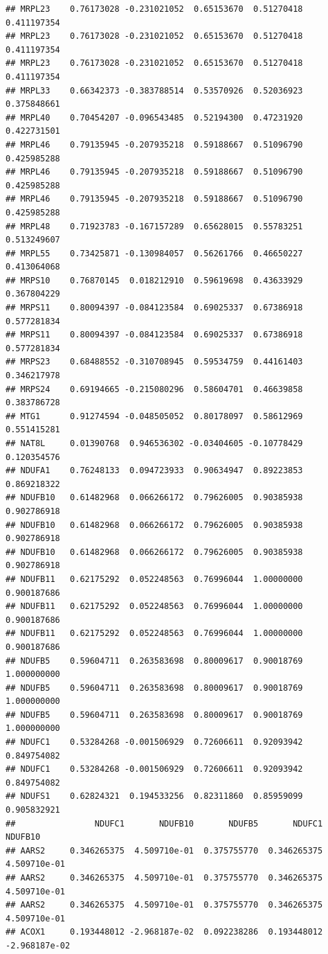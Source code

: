 \documentclass[
]{article}
\begin{document}
\begin{verbatim}
## MRPL23    0.76173028 -0.231021052  0.65153670  0.51270418  0.411197354
## MRPL23    0.76173028 -0.231021052  0.65153670  0.51270418  0.411197354
## MRPL23    0.76173028 -0.231021052  0.65153670  0.51270418  0.411197354
## MRPL33    0.66342373 -0.383788514  0.53570926  0.52036923  0.375848661
## MRPL40    0.70454207 -0.096543485  0.52194300  0.47231920  0.422731501
## MRPL46    0.79135945 -0.207935218  0.59188667  0.51096790  0.425985288
## MRPL46    0.79135945 -0.207935218  0.59188667  0.51096790  0.425985288
## MRPL46    0.79135945 -0.207935218  0.59188667  0.51096790  0.425985288
## MRPL48    0.71923783 -0.167157289  0.65628015  0.55783251  0.513249607
## MRPL55    0.73425871 -0.130984057  0.56261766  0.46650227  0.413064068
## MRPS10    0.76870145  0.018212910  0.59619698  0.43633929  0.367804229
## MRPS11    0.80094397 -0.084123584  0.69025337  0.67386918  0.577281834
## MRPS11    0.80094397 -0.084123584  0.69025337  0.67386918  0.577281834
## MRPS23    0.68488552 -0.310708945  0.59534759  0.44161403  0.346217978
## MRPS24    0.69194665 -0.215080296  0.58604701  0.46639858  0.383786728
## MTG1      0.91274594 -0.048505052  0.80178097  0.58612969  0.551415281
## NAT8L     0.01390768  0.946536302 -0.03404605 -0.10778429  0.120354576
## NDUFA1    0.76248133  0.094723933  0.90634947  0.89223853  0.869218322
## NDUFB10   0.61482968  0.066266172  0.79626005  0.90385938  0.902786918
## NDUFB10   0.61482968  0.066266172  0.79626005  0.90385938  0.902786918
## NDUFB10   0.61482968  0.066266172  0.79626005  0.90385938  0.902786918
## NDUFB11   0.62175292  0.052248563  0.76996044  1.00000000  0.900187686
## NDUFB11   0.62175292  0.052248563  0.76996044  1.00000000  0.900187686
## NDUFB11   0.62175292  0.052248563  0.76996044  1.00000000  0.900187686
## NDUFB5    0.59604711  0.263583698  0.80009617  0.90018769  1.000000000
## NDUFB5    0.59604711  0.263583698  0.80009617  0.90018769  1.000000000
## NDUFB5    0.59604711  0.263583698  0.80009617  0.90018769  1.000000000
## NDUFC1    0.53284268 -0.001506929  0.72606611  0.92093942  0.849754082
## NDUFC1    0.53284268 -0.001506929  0.72606611  0.92093942  0.849754082
## NDUFS1    0.62824321  0.194533256  0.82311860  0.85959099  0.905832921
##                NDUFC1       NDUFB10       NDUFB5       NDUFC1       NDUFB10
## AARS2     0.346265375  4.509710e-01  0.375755770  0.346265375  4.509710e-01
## AARS2     0.346265375  4.509710e-01  0.375755770  0.346265375  4.509710e-01
## AARS2     0.346265375  4.509710e-01  0.375755770  0.346265375  4.509710e-01
## ACOX1     0.193448012 -2.968187e-02  0.092238286  0.193448012 -2.968187e-02

\end{verbatim}
\end{document}
